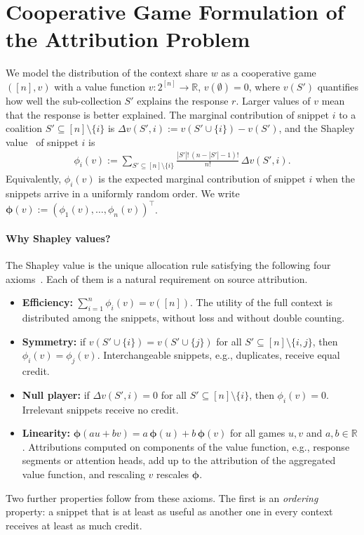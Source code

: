 \documentclass{article}
\begin{document}
\section{Cooperative Game Formulation of the Attribution Problem}
\label{sec:coop_game}

We model the distribution of the context share $w$ as a cooperative game $([n], v)$ with a value function $v: 2^{[n]} \to \mathbb{R}$, $v(\emptyset) = 0$, where $v(S')$ quantifies how well the sub-collection $S'$ explains the response $r$. Larger values of $v$ mean that the response is better explained. The marginal contribution of snippet $i$ to a coalition $S' \subseteq [n] \setminus \{i\}$ is $\Delta v(S', i) := v(S' \cup \{i\}) - v(S')$, and the Shapley value~\cite{shapley1953value} of snippet $i$ is
\begin{align}\label{eq:shapley_def}
    \phi_i(v) := \sum_{S' \subseteq [n] \setminus \{i\}} \frac{|S'|!\,(n - |S'| - 1)!}{n!} \, \Delta v(S', i).
\end{align}
Equivalently, $\phi_i(v)$ is the expected marginal contribution of snippet $i$ when the snippets arrive in a uniformly random order. We write $\boldsymbol{\phi}(v) := (\phi_1(v), \dots, \phi_n(v))^\top$.

\paragraph{Why Shapley values?}
The Shapley value is the unique allocation rule satisfying the following four axioms~\cite{shapley1953value}. Each of them is a natural requirement on source attribution.
\begin{itemize}
    \item \textbf{Efficiency:} $\sum_{i=1}^n \phi_i(v) = v([n])$. The utility of the full context is distributed among the snippets, without loss and without double counting.
    \item \textbf{Symmetry:} if $v(S' \cup \{i\}) = v(S' \cup \{j\})$ for all $S' \subseteq [n] \setminus \{i,j\}$, then $\phi_i(v) = \phi_j(v)$. Interchangeable snippets, e.g., duplicates, receive equal credit.
    \item \textbf{Null player:} if $\Delta v(S', i) = 0$ for all $S' \subseteq [n] \setminus \{i\}$, then $\phi_i(v) = 0$. Irrelevant snippets receive no credit.
    \item \textbf{Linearity:} $\boldsymbol{\phi}(a u + b v) = a\, \boldsymbol{\phi}(u) + b\, \boldsymbol{\phi}(v)$ for all games $u, v$ and $a, b \in \mathbb{R}$. Attributions computed on components of the value function, e.g., response segments or attention heads, add up to the attribution of the aggregated value function, and rescaling $v$ rescales $\boldsymbol{\phi}$.
\end{itemize}
Two further properties follow from these axioms. The first is an \emph{ordering} property: a snippet that is at least as useful as another one in every context receives at least as much credit.
\end{document}
